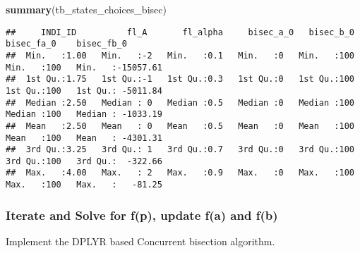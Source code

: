 \documentclass[
]{book}
\newenvironment{Shaded}{\begin{snugshade}}{\end{snugshade}}
\newcommand{\KeywordTok}[1]{\textcolor[rgb]{0.13,0.29,0.53}{\textbf{#1}}}
\newcommand{\NormalTok}[1]{#1}
\begin{document}
\begin{Shaded}
\begin{Highlighting}[]
\KeywordTok{summary}\NormalTok{(tb_states_choices_bisec)}
\end{Highlighting}
\end{Shaded}

\begin{verbatim}
##     INDI_ID          fl_A       fl_alpha     bisec_a_0   bisec_b_0     bisec_fa_0    bisec_fb_0       
##  Min.   :1.00   Min.   :-2   Min.   :0.1   Min.   :0   Min.   :100   Min.   :100   Min.   :-15057.61  
##  1st Qu.:1.75   1st Qu.:-1   1st Qu.:0.3   1st Qu.:0   1st Qu.:100   1st Qu.:100   1st Qu.: -5011.84  
##  Median :2.50   Median : 0   Median :0.5   Median :0   Median :100   Median :100   Median : -1033.19  
##  Mean   :2.50   Mean   : 0   Mean   :0.5   Mean   :0   Mean   :100   Mean   :100   Mean   : -4301.31  
##  3rd Qu.:3.25   3rd Qu.: 1   3rd Qu.:0.7   3rd Qu.:0   3rd Qu.:100   3rd Qu.:100   3rd Qu.:  -322.66  
##  Max.   :4.00   Max.   : 2   Max.   :0.9   Max.   :0   Max.   :100   Max.   :100   Max.   :   -81.25
\end{verbatim}

\hypertarget{iterate-and-solve-for-fp-update-fa-and-fb}{%
\subsubsection{Iterate and Solve for f(p), update f(a) and f(b)}\label{iterate-and-solve-for-fp-update-fa-and-fb}}

Implement the DPLYR based Concurrent bisection algorithm.
\end{document}
